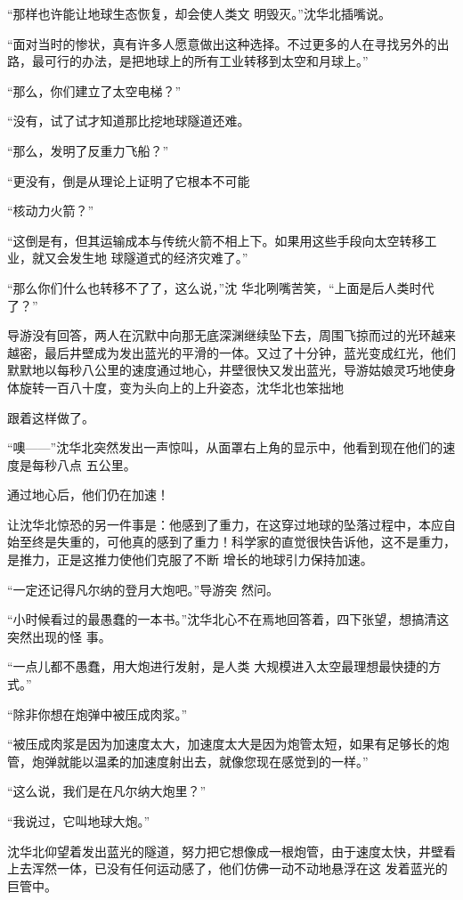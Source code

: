 \documentclass{article}
\begin{document}
“那样也许能让地球生态恢复，却会使人类文
明毁灭。”沈华北插嘴说。 

“面对当时的惨状，真有许多人愿意做出这种选择。不过更多的人在寻找另外的出路，最可行的办法，是把地球上的所有工业转移到太空和月球上。”


“那么，你们建立了太空电梯？” 

\newpage

“没有，试了试才知道那比挖地球隧道还难。


“那么，发明了反重力飞船？” 

“更没有，倒是从理论上证明了它根本不可能


“核动力火箭？” 

“这倒是有，但其运输成本与传统火箭不相上下。如果用这些手段向太空转移工业，就又会发生地
球隧道式的经济灾难了。” 

“那么你们什么也转移不了了，这么说，”沈
华北咧嘴苦笑，“上面是后人类时代了？” 

导游没有回答，两人在沉默中向那无底深渊继续坠下去，周围飞掠而过的光环越来越密，最后井壁成为发出蓝光的平滑的一体。又过了十分钟，蓝光变成红光，他们默默地以每秒八公里的速度通过地心，井壁很快又发出蓝光，导游姑娘灵巧地使身体旋转一百八十度，变为头向上的上升姿态，沈华北也笨拙地
\newpage

跟着这样做了。 

“噢——”沈华北突然发出一声惊叫，从面罩右上角的显示中，他看到现在他们的速度是每秒八点
五公里。 


通过地心后，他们仍在加速！ 

让沈华北惊恐的另一件事是：他感到了重力，在这穿过地球的坠落过程中，本应自始至终是失重的，可他真的感到了重力！科学家的直觉很快告诉他，这不是重力，是推力，正是这推力使他们克服了不断
增长的地球引力保持加速。 

“一定还记得凡尔纳的登月大炮吧。”导游突
然问。 

“小时候看过的最愚蠢的一本书。”沈华北心不在焉地回答着，四下张望，想搞清这突然出现的怪
事。 

\newpage

“一点儿都不愚蠢，用大炮进行发射，是人类
大规模进入太空最理想最快捷的方式。” 


“除非你想在炮弹中被压成肉浆。” 

“被压成肉浆是因为加速度太大，加速度太大是因为炮管太短，如果有足够长的炮管，炮弹就能以温柔的加速度射出去，就像您现在感觉到的一样。”


“这么说，我们是在凡尔纳大炮里？” 


“我说过，它叫地球大炮。” 

沈华北仰望着发出蓝光的隧道，努力把它想像成一根炮管，由于速度太快，井壁看上去浑然一体，已没有任何运动感了，他们仿佛一动不动地悬浮在这
发着蓝光的巨管中。 
\end{document}
